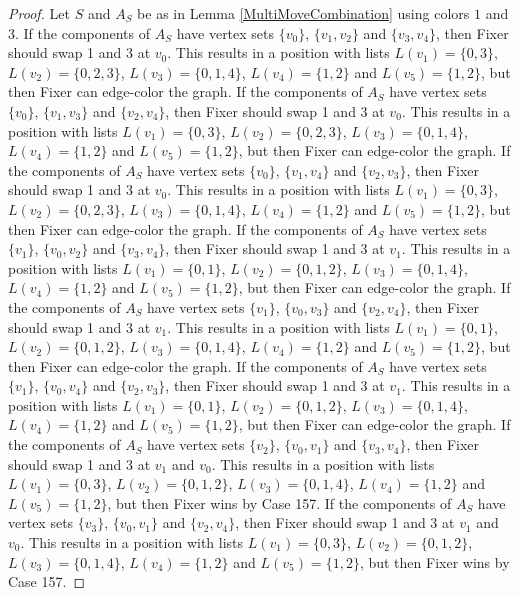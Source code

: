 \documentclass[12pt]{amsart}
\theoremstyle{plain}
\theoremstyle{definition}
\theoremstyle{remark}
\begin{document}
\begin{proof}
Let $S$ and $A_S$ be as in Lemma \ref{MultiMoveCombination} using colors $1$ and $3$. If the components of $A_S$ have vertex sets $\{v_0\}$, $\{v_1, v_2\}$ and $\{v_3, v_4\}$, then Fixer should swap 1 and 3 at $v_0$. This results in a position with lists $L(v_1) = \{0, 3\}$, $L(v_2) = \{0, 2, 3\}$, $L(v_3) = \{0, 1, 4\}$, $L(v_4) = \{1, 2\}$ and $L(v_5) = \{1, 2\}$, but then Fixer can edge-color the graph.
If the components of $A_S$ have vertex sets $\{v_0\}$, $\{v_1, v_3\}$ and $\{v_2, v_4\}$, then Fixer should swap 1 and 3 at $v_0$. This results in a position with lists $L(v_1) = \{0, 3\}$, $L(v_2) = \{0, 2, 3\}$, $L(v_3) = \{0, 1, 4\}$, $L(v_4) = \{1, 2\}$ and $L(v_5) = \{1, 2\}$, but then Fixer can edge-color the graph.
If the components of $A_S$ have vertex sets $\{v_0\}$, $\{v_1, v_4\}$ and $\{v_2, v_3\}$, then Fixer should swap 1 and 3 at $v_0$. This results in a position with lists $L(v_1) = \{0, 3\}$, $L(v_2) = \{0, 2, 3\}$, $L(v_3) = \{0, 1, 4\}$, $L(v_4) = \{1, 2\}$ and $L(v_5) = \{1, 2\}$, but then Fixer can edge-color the graph.
If the components of $A_S$ have vertex sets $\{v_1\}$, $\{v_0, v_2\}$ and $\{v_3, v_4\}$, then Fixer should swap 1 and 3 at $v_1$. This results in a position with lists $L(v_1) = \{0, 1\}$, $L(v_2) = \{0, 1, 2\}$, $L(v_3) = \{0, 1, 4\}$, $L(v_4) = \{1, 2\}$ and $L(v_5) = \{1, 2\}$, but then Fixer can edge-color the graph.
If the components of $A_S$ have vertex sets $\{v_1\}$, $\{v_0, v_3\}$ and $\{v_2, v_4\}$, then Fixer should swap 1 and 3 at $v_1$. This results in a position with lists $L(v_1) = \{0, 1\}$, $L(v_2) = \{0, 1, 2\}$, $L(v_3) = \{0, 1, 4\}$, $L(v_4) = \{1, 2\}$ and $L(v_5) = \{1, 2\}$, but then Fixer can edge-color the graph.
If the components of $A_S$ have vertex sets $\{v_1\}$, $\{v_0, v_4\}$ and $\{v_2, v_3\}$, then Fixer should swap 1 and 3 at $v_1$. This results in a position with lists $L(v_1) = \{0, 1\}$, $L(v_2) = \{0, 1, 2\}$, $L(v_3) = \{0, 1, 4\}$, $L(v_4) = \{1, 2\}$ and $L(v_5) = \{1, 2\}$, but then Fixer can edge-color the graph.
If the components of $A_S$ have vertex sets $\{v_2\}$, $\{v_0, v_1\}$ and $\{v_3, v_4\}$, then Fixer should swap 1 and 3 at $v_1$ and $v_0$. This results in a position with lists $L(v_1) = \{0, 3\}$, $L(v_2) = \{0, 1, 2\}$, $L(v_3) = \{0, 1, 4\}$, $L(v_4) = \{1, 2\}$ and $L(v_5) = \{1, 2\}$, but then Fixer wins by Case 157.
If the components of $A_S$ have vertex sets $\{v_3\}$, $\{v_0, v_1\}$ and $\{v_2, v_4\}$, then Fixer should swap 1 and 3 at $v_1$ and $v_0$. This results in a position with lists $L(v_1) = \{0, 3\}$, $L(v_2) = \{0, 1, 2\}$, $L(v_3) = \{0, 1, 4\}$, $L(v_4) = \{1, 2\}$ and $L(v_5) = \{1, 2\}$, but then Fixer wins by Case 157.

\end{proof}
\end{document}

